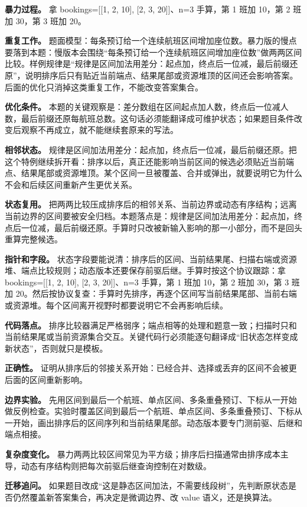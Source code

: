 \textbf{暴力过程。} 拿 bookings=[[1, 2, 10], [2, 3, 20]]、n=3 手算，第 1 班加 10，第 2 班加 30，第 3 班加 20。

\textbf{重复工作。} 题面模型：每条预订给一个连续航班区间增加座位数。暴力版的慢点要落到本题：慢版本会围绕“每条预订给一个连续航班区间增加座位数”做两两区间比较。样例规律是“规律是区间加法用差分：起点加，终点后一位减，最后前缀还原”，说明排序后只有贴近当前端点、结果尾部或资源堆顶的区间还会影响答案。后面的优化只消掉这类重复工作，不能改变答案集合。

\textbf{优化条件。} 本题的关键观察是：差分数组在区间起点加人数，终点后一位减人数，最后前缀还原每航班总数。这句话必须能翻译成可维护状态；如果题目条件改变后观察不再成立，就不能继续套原来的写法。

\textbf{相邻状态。} 规律是区间加法用差分：起点加，终点后一位减，最后前缀还原。把这个特例继续拆开看：排序以后，真正还能影响当前区间的候选必须贴近当前端点、结果尾部或资源堆顶。某个区间一旦被覆盖、合并或弹出，就要说明它为什么不会和后续区间重新产生更优关系。

\textbf{状态复用。} 把两两比较压成排序后的相邻关系、当前边界或动态有序结构；远离当前边界的区间要被安全归档。本题落点是：规律是区间加法用差分：起点加，终点后一位减，最后前缀还原。手算时只改被新输入影响的那一小部分，而不是回头重算完整候选。

\textbf{指针和字段。} 状态字段要能说清：排序后的区间、当前结果尾、扫描右端或资源堆、端点比较规则；动态版本还要保存前驱后继。手算时按这个协议跟踪：拿 bookings=[[1, 2, 10], [2, 3, 20]]、n=3 手算，第 1 班加 10，第 2 班加 30，第 3 班加 20。然后按协议复查：手算时先排序，再逐个区间写当前结果尾部、当前右端或资源堆。每个区间离开视野时都要说明它不会再影响后续。

\textbf{代码落点。} 排序比较器满足严格弱序；端点相等的处理和题意一致；扫描时只和当前结果尾或当前资源集合交互。关键代码行必须能逐句翻译成“旧状态怎样变成新状态”，否则就只是模板。

\textbf{正确性。} 证明从排序后的邻接关系开始：已经合并、选择或丢弃的区间不会被更后面的区间重新影响。

\textbf{边界实验。} 先用区间到最后一个航班、单点区间、多条重叠预订、下标从一开始做反例检查。实验时覆盖区间到最后一个航班、单点区间、多条重叠预订、下标从一开始，画出排序后的区间序列和当前结果尾部。动态版本要专门测前驱、后继和端点相接。

\textbf{复杂度变化。} 暴力两两比较区间常见为平方级；排序后扫描通常由排序成本主导，动态有序结构则把每次前驱后继查询控制在对数级。

\textbf{迁移追问。} 如果题目改成“这是静态区间加法，不需要线段树”，先判断原状态是否仍然覆盖新答案集合，再决定是微调边界、改 value 语义，还是换算法。

